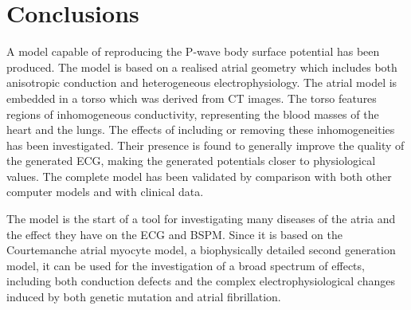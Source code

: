 \section{Conclusions}

A model capable of reproducing the P-wave body surface potential has been
produced.
The model is based on a realised atrial geometry which includes both anisotropic
conduction and heterogeneous electrophysiology.
The atrial model is embedded in a torso which was derived from CT images.
The torso features regions of inhomogeneous conductivity, representing the blood
masses of the heart and the lungs.
The effects of including or removing these inhomogeneities has been
investigated.
Their presence is found to generally improve the quality of the generated ECG,
making the generated potentials closer to physiological values.
The complete model has been validated by comparison with both other computer
models and with clinical data.

The model is the start of a tool for investigating many diseases of the atria
and the effect they have on the ECG and BSPM.
Since it is based on the Courtemanche atrial myocyte model, a biophysically
detailed second generation model, it can be used for the investigation of a
broad spectrum of effects, including both conduction defects and the complex
electrophysiological changes induced by both genetic mutation and atrial
fibrillation.
